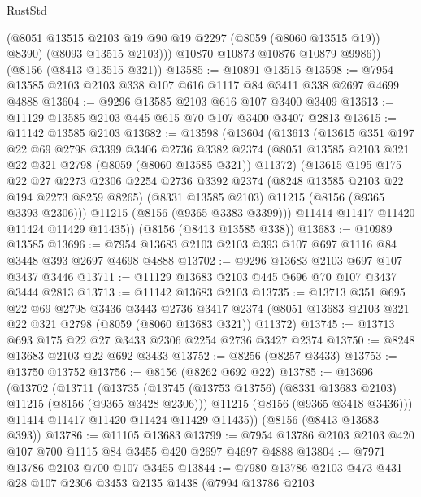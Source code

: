 \begin{lexlean}{RustStd}
\begin{coremodule}
{\begin{coremodule}
{{{{{{{{{{{{{{{{{{{{{{{{{{{{{{{{{{            (@8051 @13515 @2103 @19 @90 @19 @2297 (@8059 (@8060 @13515 @19)) @8390)
            (@8093 @13515 @2103)))
        @10870
        @10873
        @10876
        @10879
        @9986))
    (@8156 (@8413 @13515 @321))
@13585 := @10891 @13515
@13598 := @7954 @13585 @2103 @2103 @338 @107 @616 @1117 @84 @3411 @338 @2697 @4699 @4888
@13604 := @9296 @13585 @2103 @616 @107 @3400 @3409
@13613 := @11129 @13585 @2103 @445 @615 @70 @107 @3400 @3407 @2813
@13615 := @11142 @13585 @2103
@13682 := @13598
    (@13604
      (@13613
        (@13615
          @351
          @197
          @22
          @69
          @2798
          @3399
          @3406
          @2736
          @3382
          @2374
          (@8051 @13585 @2103 @321 @22 @321 @2798 (@8059 (@8060 @13585 @321)) @11372)
          (@13615
            @195
            @175
            @22
            @27
            @2273
            @2306
            @2254
            @2736
            @3392
            @2374
            (@8248 @13585 @2103 @22 @194 @2273 @8259 @8265)
            (@8331 @13585 @2103)
            @11215
            (@8156 (@9365 @3393 @2306)))
          @11215
          (@8156 (@9365 @3383 @3399)))
        @11414
        @11417
        @11420
        @11424
        @11429
        @11435))
    (@8156 (@8413 @13585 @338))
@13683 := @10989 @13585
@13696 := @7954 @13683 @2103 @2103 @393 @107 @697 @1116 @84 @3448 @393 @2697 @4698 @4888
@13702 := @9296 @13683 @2103 @697 @107 @3437 @3446
@13711 := @11129 @13683 @2103 @445 @696 @70 @107 @3437 @3444 @2813
@13713 := @11142 @13683 @2103
@13735 := @13713
    @351
    @695
    @22
    @69
    @2798
    @3436
    @3443
    @2736
    @3417
    @2374
    (@8051 @13683 @2103 @321 @22 @321 @2798 (@8059 (@8060 @13683 @321)) @11372)
@13745 := @13713 @693 @175 @22 @27 @3433 @2306 @2254 @2736 @3427 @2374
@13750 := @8248 @13683 @2103 @22 @692 @3433
@13752 := @8256 (@8257 @3433)
@13753 := @13750 @13752
@13756 := @8156 (@8262 @692 @22)
@13785 := @13696
    (@13702
      (@13711
        (@13735
          (@13745 (@13753 @13756) (@8331 @13683 @2103) @11215 (@8156 (@9365 @3428 @2306)))
          @11215
          (@8156 (@9365 @3418 @3436)))
        @11414
        @11417
        @11420
        @11424
        @11429
        @11435))
    (@8156 (@8413 @13683 @393))
@13786 := @11105 @13683
@13799 := @7954 @13786 @2103 @2103 @420 @107 @700 @1115 @84 @3455 @420 @2697 @4697 @4888
@13804 := @7971 @13786 @2103 @700 @107 @3455
@13844 := @7980
    @13786
    @2103
    @473
    @431
    @28
    @107
    @2306
    @3453
    @2135
    @1438
    (@7994
      @13786
      @2103
}}}}}}}}}}}}}}}}}}}}}}}}}}}}}}}}}}
\end{coremodule}}
\end{coremodule}
\end{lexlean}
